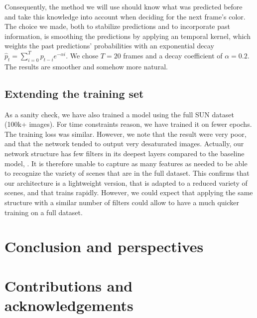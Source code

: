 \documentclass[10pt,twocolumn,letterpaper]{article}
\begin{document}
Consequently, the method we will use should know what was predicted before and take this knowledge into account when deciding for the next frame's color. The choice we made, both to stabilize predictions and to incorporate past information, is smoothing the predictions by applying an temporal kernel, which weights the past predictions' probabilities with an exponential decay $\hat p_t = \sum_{i = 0}^T p_{t-i} e^{-\alpha i}$. We chose $T=20$ frames and a decay coefficient of $\alpha=0.2$. The results are smoother and somehow more natural.

\subsection{Extending the training set}

As a sanity check, we have also trained a model using the full SUN dataset (100k+ images). For time constraints reason, we have trained it on fewer epochs. The training loss was similar. However, we note that the result were very poor, and that the network tended to output very desaturated images. Actually, our network structure has few filters in its deepest layers compared to the baseline model, \cite{zhang2016colorful}. It is therefore unable to capture as many features as needed to be able to recognize the variety of scenes that are in the full dataset. This confirms that our architecture is a lightweight version, that is adapted to a reduced variety of scenes, and that trains rapidly. However, we could expect that applying the same structure with a similar number of filters could allow to have a much quicker training on a full dataset. 
\section{Conclusion and perspectives}
\section*{Contributions and acknowledgements}


{\small


}
\end{document}
